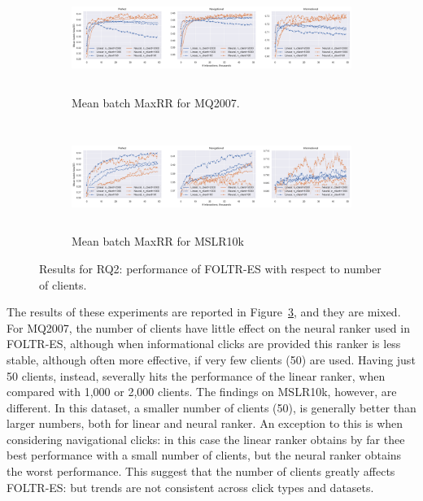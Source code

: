 \begin{figure}[t]
	\centering
	\begin{subfigure}{1\textwidth}
		\includegraphics[width=15cm, height=3.5cm]{images/RQ2/mq2007_foltr_client_both_p0.9.png}
		\caption{Mean batch MaxRR for MQ2007.}
		\label{fig:mq2007-rq2}
	\end{subfigure}
	\begin{subfigure}{1\textwidth}
		\includegraphics[width=15cm, height=3.5cm]{images/RQ2/mslr10k_foltr_client_both_p0.9.png}
		\caption{Mean batch MaxRR for MSLR10k}
		\label{fig:mslr10k-rq2}
	\end{subfigure}
	\caption{Results for RQ2: performance of FOLTR-ES with respect to number of clients. \label{fig:RQ2}} 
\end{figure}


The results of these experiments are reported in Figure~\ref{fig:RQ2}, and they are mixed. For MQ2007, the number of clients have little effect on the neural ranker used in FOLTR-ES, although when informational clicks are provided this ranker is less stable, although often more effective, if very few clients (50) are used. Having just 50 clients, instead, severally hits the performance of the linear ranker, when compared with 1,000 or 2,000 clients. The findings on MSLR10k, however, are different. In this dataset, a smaller number of clients (50), is generally better than larger numbers, both for linear and neural ranker. An exception to this is when considering navigational clicks: in this case the linear ranker obtains by far thee best performance with a small number of clients, but the neural ranker obtains the worst performance. This suggest that the number of clients greatly affects FOLTR-ES: but trends are not consistent across click types and datasets. 


